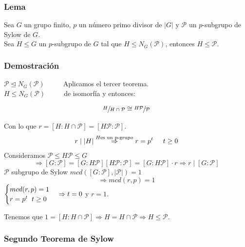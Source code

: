 \documentclass[11pt,a4paper]{article}
\begin{document}

\subsubsection*{Lema}

Sea $G$ un grupo finito, $p$ un número primo divisor de $|G|$ y $\mathcal{P}$ un $p$-subgrupo de Sylow de $G$. \\
Sea $H \leqslant G$ un $p$-subgrupo de $G$ tal que $H \leqslant N_{G}(\mathcal{P})$, entonces $H \leqslant \mathcal{P}$.

\subsubsection*{Demostración}

$\mathcal{P} \unlhd N_{G}(\mathcal{P}) \hspace{1cm}$ Aplicamos el tercer teorema. \\
$H \leqslant N_{G}(\mathcal{P}) \hspace{1cm}$ de isomorfía y entonces:

$$\sfrac{H}{H \cap \mathcal{P}} \cong \sfrac{H\mathcal{P}}{\mathcal{P}}$$

Con lo que $r = [H : H \cap \mathcal{P}] = [H\mathcal{P} : \mathcal{P}]$.
$$r \mid |H| \overset{H \text{es un p-grupo}}{\Rightarrow} r = p^{t} \hspace{0.5cm} t \geq 0$$
Consideramos $\mathcal{P} \leqslant H\mathcal{P} \leqslant G$
$$\Rightarrow [G:\mathcal{P}] = [G:H\mathcal{P}] [H\mathcal{P}:\mathcal{P}] = [G:H\mathcal{P}] \cdot r \Rightarrow r \mid [G:\mathcal{P}]$$
$\mathcal{P}$ subgrupo de Sylow $mcd([G:\mathcal{P}], |\mathcal{P}|) = 1$
$$\Rightarrow mcd(r, p) = 1$$
$\begin{cases}
mcd(r, p) = 1 \\
r = p^{t} \hspace{0.2cm} t \geq 0
\end{cases}
\Rightarrow t = 0$ y $r = 1$.

Tenemos que $1 = [H:H \cap \mathcal{P}] \Rightarrow H = H \cap \mathcal{P} \Rightarrow H \leqslant \mathcal{P}$.

\subsubsection*{Segundo Teorema de Sylow}
\end{document}
